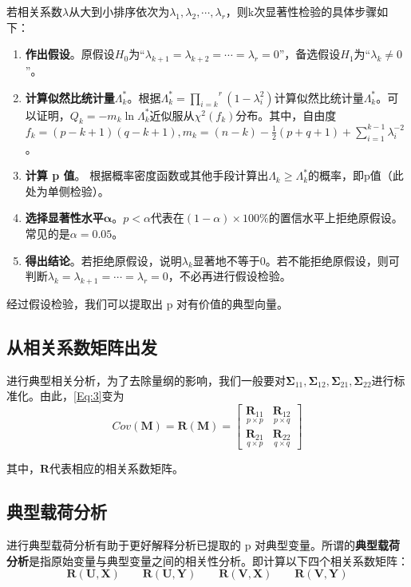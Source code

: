 \documentclass[withoutpreface]{cumcmthesis}
\begin{document}
若相关系数$\lambda$从大到小排序依次为$\lambda_1,\lambda_2,\cdots,\lambda_r$，则k次显著性检验的具体步骤如下：

\begin{enumerate}
    \item \textbf{作出假设}。原假设$H_0$为“$\lambda_{k+1}=\lambda _{k+2}=\cdots=\lambda_r=0$”，备选假设$H_1$为“$\lambda_k\ne 0$”。
    \item \textbf{计算似然比统计量}$\Lambda_k^*$。根据$\Lambda_k^*=\overset{r}{\underset{i=k}{\prod}}(1-\lambda_i^2)$计算似然比统计量$\Lambda_k^*$。可以证明，$Q_k=-m_k\ln \Lambda_k^*$近似服从$\chi^2(f_k)$分布。其中，自由度$f_k=(p-k+1)(q-k+1),m_k=(n-k)-\frac{1}{2}(p+q+1)+\sum\limits_{i=1}^{k-1}\lambda_i^{-2}$。
    \item \textbf{计算 p 值}。 根据概率密度函数或其他手段计算出$\Lambda_k\ge \Lambda_k^*$的概率，即p值（此处为单侧检验）。
    \item \textbf{选择显著性水平}$\mathbf{\alpha}$。$p<\alpha$代表在$(1-\alpha)\times 100\%$的置信水平上拒绝原假设。常见的是$\alpha=0.05$。
    \item \textbf{得出结论}。若拒绝原假设，说明$\lambda_k$显著地不等于0。若不能拒绝原假设，则可判断$\lambda_k=\lambda_{k+1}=\cdots=\lambda_{r}=0$，不必再进行假设检验。
\end{enumerate}

经过假设检验，我们可以提取出 p 对有价值的典型向量。

\subsection{从相关系数矩阵出发}
进行典型相关分析，为了去除量纲的影响，我们一般要对$\boldsymbol{\Sigma }_{11},\boldsymbol{\Sigma }_{12},\boldsymbol{\Sigma }_{21},\boldsymbol{\Sigma }_{22}$进行标准化。由此，\cref{Eq:3}变为
\begin{equation}\label{Eq:14}
    Cov(\mathbf{M})=\mathbf{R(M)}=\begin{bmatrix}
        \underset{p\times p}{\boldsymbol{R}_{11}} & \underset{p\times q}{\boldsymbol{R}_{12}} \\
        \underset{q\times p}{\boldsymbol{R}_{21}} & \underset{q\times q}{\boldsymbol{R}_{22}}
    \end{bmatrix}
\end{equation}

其中，$\mathbf{R}$代表相应的相关系数矩阵。

\subsection{典型载荷分析}
进行典型载荷分析有助于更好解释分析已提取的 p 对典型变量。所谓的\textbf{典型载荷分析}是指原始变量与典型变量之间的相关性分析。即计算以下四个相关系数矩阵：
\begin{equation}
    \mathbf{R}(\mathbf{U},\mathbf{X})\qquad\mathbf{R}(\mathbf{U},\mathbf{Y})\qquad\mathbf{R}(\mathbf{V},\mathbf{X})\qquad\mathbf{R}(\mathbf{V},\mathbf{Y})
\end{equation}
\end{document}
